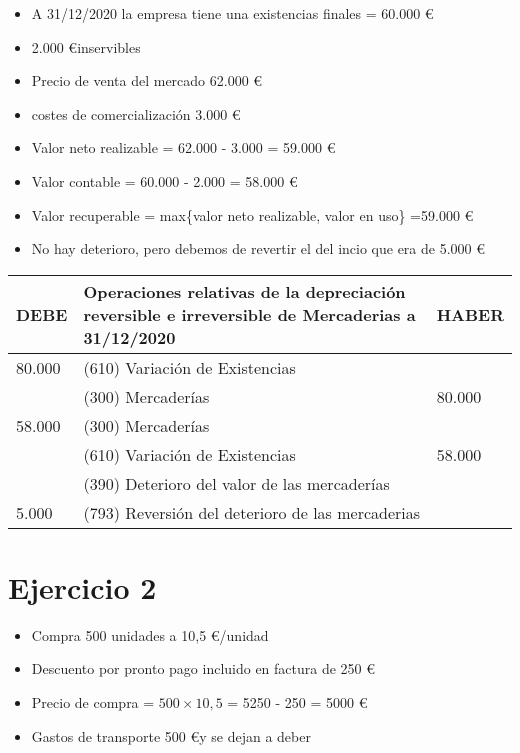 \documentclass[a4paper,12pt]{article}
\newcommand{\fec}{31/12/}
\newcommand{\valorrecuperable}{Valor recuperable = max\{valor neto realizable, valor en uso\} =}
\newcommand{\VC}{Valor contable = }
\newcommand{\ecuacion}[1]{$#1$}
\newcommand{\varExist}{(610) Variación de Existencias}
\newcommand{\mercaderias}{(300) Mercaderías}
\begin{document}
\begin{itemize}
    \item A \fec2020 la empresa tiene una existencias finales  = 60.000 \euro
    \item 2.000 \euro inservibles 
    \item Precio de venta del mercado 62.000 \euro
    \item costes de comercialización 3.000 \euro
    \item Valor neto realizable = 62.000 - 3.000 = 59.000 \euro
    \item \VC 60.000 - 2.000 = 58.000 \euro
    \item \valorrecuperable 59.000 \euro
    \item No hay deterioro, pero debemos de revertir el del incio que era de 5.000 \euro
\end{itemize}

\begin{table}[H]
    \centering
    \begin{tabular}{|p{3cm}|p{6cm}|p{3cm}|}
    \hline
    \textbf{DEBE} & \textbf{Operaciones relativas de la depreciación reversible e irreversible de Mercaderias a \fec2020} & \textbf{HABER} \\
    \hline
    80.000 & \varExist & \\
    \hline
    & \mercaderias & 80.000\\
    \hline
    58.000 & \mercaderias & \\
    \hline
    & \varExist & 58.000\\
    \hline
    & (390) Deterioro del valor de las mercaderías & \\
    \hline
    5.000 & (793) Reversión del deterioro de las mercaderias & \\
    \hline
    \end{tabular}
\end{table}

\section{Ejercicio 2}

\begin{itemize}
    \item Compra 500 unidades a 10,5 \euro/unidad
    \item Descuento por pronto pago incluido en factura de 250 \euro
    \item Precio de compra = \ecuacion{500 \times 10,5} = 5250 - 250 = 5000 \euro
    \item Gastos de transporte 500 \euro y se dejan a deber
\end{itemize}
\end{document}
